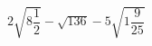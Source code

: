 \begin{ex}[type=expression]
	\begin{condition}
		\( 2\sqrt{8\dfrac{1}{2}}-\sqrt{136}-5\sqrt{1\dfrac{9}{25}} \)
	\end{condition}
\end{ex}